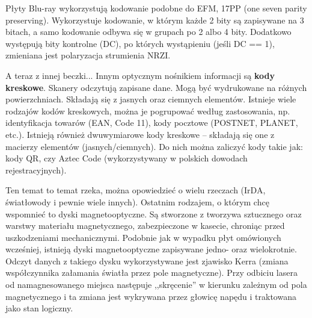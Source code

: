 Płyty Blu-ray wykorzystują kodowanie podobne do EFM, 17PP (one seven parity preserving). Wykorzystuje kodowanie, w którym każde 2 bity są zapisywane na 3 bitach, a samo kodowanie odbywa się w grupach po 2 albo 4 bity. Dodatkowo występują bity kontrolne (DC), po których wystąpieniu (jeśli DC == 1), zmieniana jest polaryzacja strumienia NRZI.

A teraz z innej beczki... Innym optycznym nośnikiem informacji są \textbf{kody kreskowe}. Skanery odczytują zapisane dane. Mogą być wydrukowane na różnych powierzchniach. Składają się z jasnych oraz ciemnych elementów. Istnieje wiele rodzajów kodów kreskowych, można je pogrupować według zastosowania, np. identyfikacja towarów (EAN, Code 11), kody pocztowe (POSTNET, PLANET, etc.). Istnieją również dwuwymiarowe kody kreskowe -- składają się one z macierzy elementów (jasnych/ciemnych). Do nich można zaliczyć kody takie jak: kody QR, czy Aztec Code (wykorzystywany w polskich dowodach rejestracyjnych).

Ten temat to temat rzeka, można opowiedzieć o wielu rzeczach (IrDA, światłowody i pewnie wiele innych). Ostatnim rodzajem, o którym chcę wspomnieć to dyski magnetooptyczne. Są stworzone z tworzywa sztucznego oraz warstwy materiału magnetycznego, zabezpieczone w kasecie, chroniąc przed uszkodzeniami mechanicznymi. Podobnie jak w wypadku płyt omówionych wcześniej, istnieją dyski magnetooptyczne zapisywane jedno- oraz wielokrotnie. Odczyt danych z takiego dysku wykorzystywane jest zjawisko Kerra (zmiana współczynnika załamania światła przez pole magnetyczne). Przy odbiciu lasera od namagnesowanego miejsca następuje ,,skręcenie'' w kierunku zależnym od pola magnetycznego i ta zmiana jest wykrywana przez głowicę napędu i traktowana jako stan logiczny.